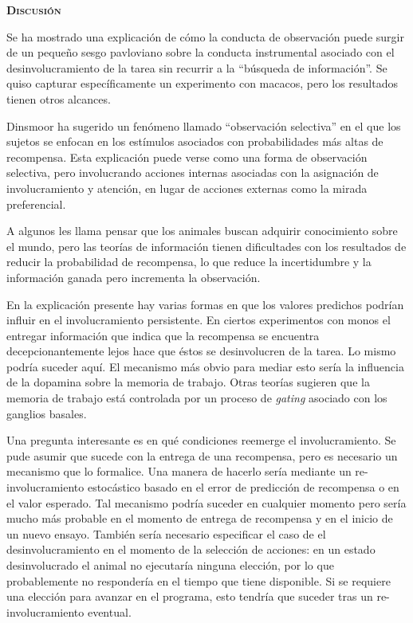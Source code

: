 \documentclass[a4paper,12pt]{article}
\begin{document}
{\scshape\bfseries Discusión}

Se ha mostrado una explicación de cómo la conducta de observación puede surgir de un pequeño sesgo pavloviano sobre la conducta instrumental asociado con el desinvolucramiento de la tarea sin recurrir a la ``búsqueda de información''. Se quiso capturar específicamente un experimento con macacos, pero los resultados tienen otros alcances. 

Dinsmoor ha sugerido un fenómeno llamado ``observación selectiva'' en el que los sujetos se enfocan en los estímulos asociados con probabilidades más altas de recompensa. Esta explicación puede verse como una forma de observación selectiva, pero involucrando acciones internas asociadas con la asignación de involucramiento y atención, en lugar de acciones externas como la mirada preferencial. 

A algunos les llama pensar que los animales buscan adquirir conocimiento sobre el mundo, pero las teorías de información tienen dificultades con los resultados de reducir la probabilidad de recompensa, lo que reduce la incertidumbre y la información ganada pero incrementa la observación. 

En la explicación presente hay varias formas en que los valores predichos podrían influir en el involucramiento persistente. En ciertos experimentos con monos el entregar información que indica que la recompensa se encuentra decepcionantemente lejos hace que éstos se desinvolucren de la tarea. Lo mismo podría suceder aquí. El mecanismo más obvio para mediar esto sería la influencia de la dopamina sobre la memoria de trabajo. Otras teorías sugieren que la memoria de trabajo está controlada por un proceso de {\itshape gating} asociado con los ganglios basales. 

Una pregunta interesante es en qué condiciones reemerge el involucramiento. Se pude asumir que sucede con la entrega de una recompensa, pero es necesario un mecanismo que lo formalice. Una manera de hacerlo sería mediante un re-involucramiento estocástico basado en el error de predicción de recompensa o en el valor esperado. Tal mecanismo podría suceder en cualquier momento pero sería mucho más probable en el momento de entrega de recompensa y en el inicio de un nuevo ensayo. También sería necesario especificar el caso de el desinvolucramiento en el momento de la selección de acciones: en un estado desinvolucrado el animal no ejecutaría ninguna elección, por lo que probablemente no respondería en el tiempo que tiene disponible. Si se requiere una elección para avanzar en el programa, esto tendría que suceder tras un re-involucramiento eventual.
\end{document}

